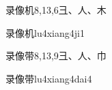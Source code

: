 \begin{Entry}{录像机}{8,13,6}{⼹、⼈、⽊}
  \begin{Phonetics}{录像机}{lu4xiang4ji1}
  \end{Phonetics}
\end{Entry}

\begin{Entry}{录像带}{8,13,9}{⼹、⼈、⼱}
  \begin{Phonetics}{录像带}{lu4xiang4dai4}
  \end{Phonetics}
\end{Entry}


